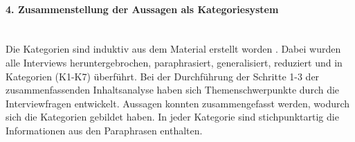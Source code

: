 \paragraph{4. Zusammenstellung der Aussagen als Kategoriesystem}\label{sec:kategorien}\mbox{} \\
Die Kategorien sind induktiv aus dem Material erstellt worden \cite{mayring2012qualitative}. Dabei wurden alle Interviews heruntergebrochen, paraphrasiert, generalisiert, reduziert und in Kategorien (K1-K7) überführt. Bei der Durchführung der Schritte 1-3 der zusammenfassenden Inhaltsanalyse haben sich Themenschwerpunkte durch die Interviewfragen entwickelt. Aussagen konnten zusammengefasst werden, wodurch sich die Kategorien gebildet haben. In jeder Kategorie sind stichpunktartig die Informationen aus den Paraphrasen enthalten. \\
